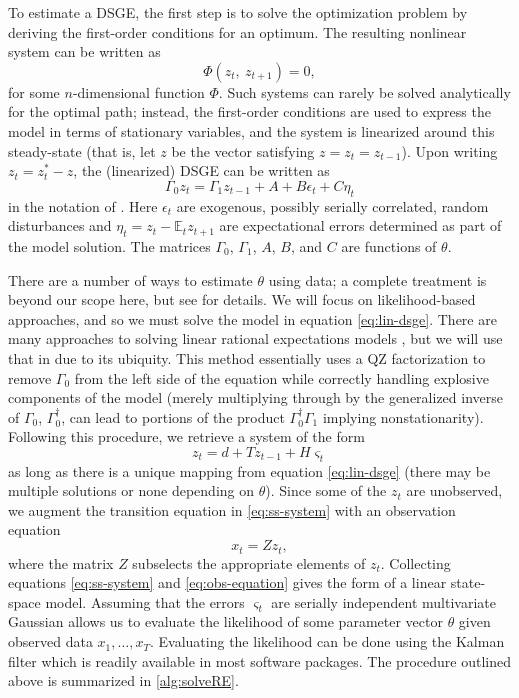 \documentclass[11pt]{article}
\newcommand{\E}{\mathbb{E}}
\begin{document}
To estimate a DSGE, the first step is to solve the optimization problem
by deriving the first-order conditions for an optimum. The resulting
nonlinear system can be written as \begin{equation}
  \Phi(z_t,\ z_{t+1})=0,
\end{equation} for some \(n\)-dimensional function \(\Phi\). Such
systems can rarely be solved analytically for the optimal path; instead,
the first-order conditions are used to express the model in terms of
stationary variables, and the system is linearized around this
steady-state (that is, let \(z\) be the vector satisfying
\(z=z_t=z_{t-1}\)). Upon writing \(z_t = z^*_t - z\), the (linearized)
DSGE can be written as \begin{equation}
  \Gamma_0 z_t = \Gamma_1 z_{t-1} + A + B \epsilon_t + C \eta_t
  \label{eq:lin-dsge}
\end{equation} in the notation of \citet{Sims2002}. Here \(\epsilon_t\)
are exogenous, possibly serially correlated, random disturbances and
\(\eta_t=z_t - \E_t z_{t+1}\) are expectational errors determined as
part of the model solution. The matrices \(\Gamma_0\), \(\Gamma_1\),
\(A\), \(B\), and \(C\) are functions of \(\theta\).

There are a number of ways to estimate \(\theta\) using data; a complete
treatment is beyond our scope here, but see \citet{DeJongDave2007} for
details. We will focus on likelihood-based approaches, and so we must
solve the model in equation \eqref{eq:lin-dsge}. There are many
approaches to solving linear rational expectations models
\citep[e.g.][]{BlanchardKahn1980,Klein2000}, but we will use that in
\citet{Sims2002} due to its ubiquity. This method essentially uses a QZ
factorization to remove \(\Gamma_0\) from the left side of the equation
while correctly handling explosive components of the model (merely
multiplying through by the generalized inverse of \(\Gamma_0\),
\(\Gamma_0^\dagger\), can lead to portions of the product
\(\Gamma_0^\dagger \Gamma_1\) implying nonstationarity). Following this
procedure, we retrieve a system of the form \begin{equation}
  \label{eq:ss-system}
  z_t = d + T z_{t-1} + H \varsigma_t
\end{equation} as long as there is a unique mapping from equation
\eqref{eq:lin-dsge} (there may be multiple solutions or none depending
on \(\theta\)). Since some of the \(z_t\) are unobserved, we augment the
transition equation in \eqref{eq:ss-system} with an observation equation
\begin{equation}
  \label{eq:obs-equation}
  x_t = Z z_t,
\end{equation} where the matrix \(Z\) subselects the appropriate
elements of \(z_t\). Collecting equations \eqref{eq:ss-system} and
\eqref{eq:obs-equation} gives the form of a linear state-space model.
Assuming that the errors \(\varsigma_t\) are serially independent
multivariate Gaussian allows us to evaluate the likelihood of some
parameter vector \(\theta\) given observed data \(x_1,\ldots,x_T\).
Evaluating the likelihood can be done using the Kalman filter
\citep{Kalman1960} which is readily available in most software packages.
The procedure outlined above is summarized in \autoref{alg:solveRE}.
\end{document}
